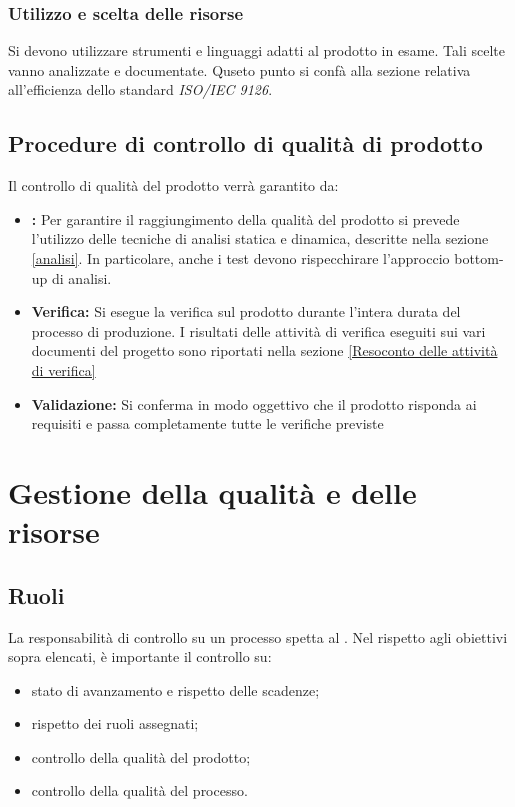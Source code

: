 \documentclass[12pt,a4paper]{article}
\begin{document}
\subsubsection{Utilizzo e scelta delle risorse}
Si devono utilizzare strumenti e linguaggi adatti al prodotto in esame. Tali scelte vanno analizzate e documentate. Quseto punto si confà alla sezione relativa all'efficienza dello standard \textit{ISO/IEC 9126}.


\subsection{Procedure di controllo di qualità di prodotto}\label{sec:procedure-di-controllo-di-qualità-di-prodotto}
Il controllo di qualità del prodotto verrà garantito da:
\begin{itemize}
	\item \textbf{:} Per garantire il raggiungimento della qualità del prodotto si prevede l'utilizzo delle tecniche di analisi statica e dinamica, descritte nella sezione \ref{analisi}. In particolare, anche i test devono rispecchirare l'approccio bottom-up di analisi.
	\item \textbf{Verifica:} Si esegue la verifica sul prodotto durante l'intera durata del processo di produzione. I risultati delle attività di verifica eseguiti sui vari documenti del progetto sono riportati nella sezione \ref{Resoconto delle attività di verifica}
	\item \textbf{Validazione:} Si conferma in modo oggettivo che il prodotto risponda ai requisiti e passa completamente tutte le verifiche previste
\end{itemize}

\newpage

\section{Gestione della qualità e delle risorse}
\subsection{Ruoli}
La responsabilità di controllo su un processo spetta al \PM{}. Nel rispetto agli obiettivi sopra elencati, è importante il controllo su:
\begin{itemize}
	\item stato di avanzamento e rispetto delle scadenze;
	\item rispetto dei ruoli assegnati;
	\item controllo della qualità del prodotto;
	\item controllo della qualità del processo. 
\end{itemize}
\end{document}
